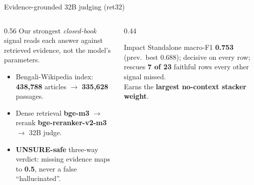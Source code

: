 \documentclass[aspectratio=169,11pt,t]{beamer}
\newcommand{\metric}[1]{{\color{primary}\bfseries #1}}
\begin{document}
\begin{frame}{Evidence-grounded 32B judging (ret32)}
  \begin{columns}[T]
    \begin{column}{0.56\textwidth}
      Our strongest \emph{closed-book} signal reads each answer against retrieved evidence, not the model's parameters.
      \begin{itemize}
        \item Bengali-Wikipedia index: \metric{438{,}788} articles $\to$ \metric{335{,}628} passages.
        \item Dense retrieval \textbf{bge-m3} $\to$ rerank \textbf{bge-reranker-v2-m3} $\to$ 32B judge.
        \item \textbf{UNSURE-safe} three-way verdict: missing evidence maps to \metric{0.5}, never a false ``hallucinated''.
      \end{itemize}
    \end{column}
    \begin{column}{0.44\textwidth}
      \begin{block}{Impact}
        Standalone macro-F1 \metric{0.753} (prev.\ best 0.688); decisive on every row; rescues \metric{7 of 23} faithful rows every other signal missed.\\[0.3em]
        Earns the \textbf{largest no-context stacker weight}.
      \end{block}
    \end{column}
  \end{columns}
\end{frame}
\end{document}
